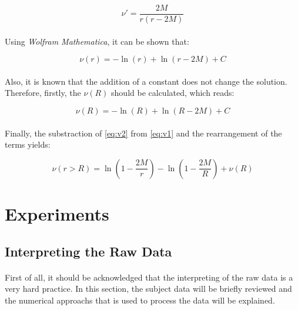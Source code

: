 \documentclass[letterpaper,12pt]{article}
\begin{document}
\begin{equation*}
    \nu' = \frac{2M}{r\left(r - 2M\right)}
\end{equation*}

\paragraph{} Using \textit{Wolfram Mathematica}, it can be shown that:

\begin{equation}
    \label{eq:v1}
    \nu(r) = -\ln(r) + \ln(r -2M) + C
\end{equation}

\paragraph{} Also, it is known that the addition of a constant does not change the solution. Therefore, firstly, the $\nu(R)$ should be calculated, which reads:

\begin{equation}
    \label{eq:v2}
    \nu(R) = -\ln(R) + \ln(R -2M) + C
\end{equation}

\paragraph{}Finally, the substraction of \eqref{eq:v2} from \eqref{eq:v1} and the rearrangement of the terms yields:

\begin{equation*}
    \nu(r>R) = \ln(1-\frac{2M}{r}) - \ln(1-\frac{2M}{R})+\nu(R) 
\end{equation*}



\section{Experiments}
\subsection{Interpreting the Raw Data}
\paragraph{} First of all, it should be acknowledged that the interpreting of the raw data is a very hard practice. In this section, the subject data will be briefly reviewed and the numerical approachs that is used to process the data will be explained.
\end{document}
